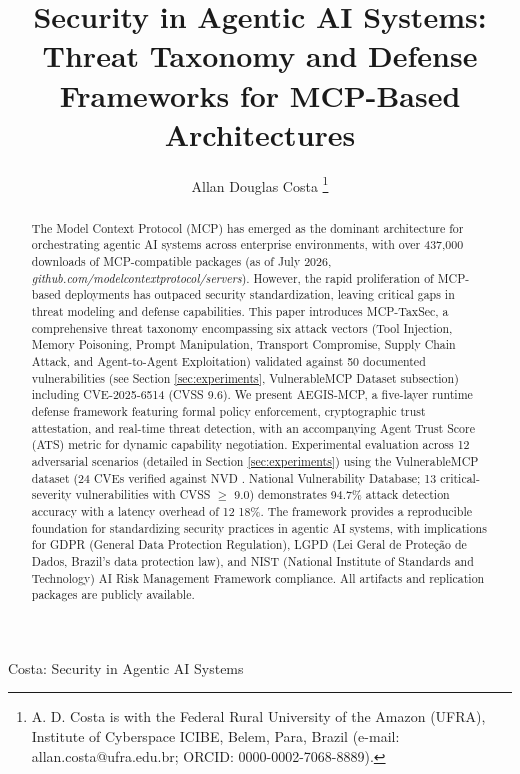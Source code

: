 \documentclass[12pt,twocolumn,journal]{IEEEtran}
\begin{document}
\title{Security in Agentic AI Systems: Threat Taxonomy and Defense Frameworks for MCP-Based Architectures}

\author{Allan Douglas Costa
\thanks{A. D. Costa is with the Federal Rural University of the Amazon (UFRA), Institute of Cyberspace ICIBE, Belem, Para, Brazil (e-mail: allan.costa@ufra.edu.br; ORCID: 0000-0002-7068-8889).}
}

%
{Costa: Security in Agentic AI Systems}

\maketitle

\begin{abstract}
The Model Context Protocol (MCP) has emerged as the dominant architecture for orchestrating agentic AI systems across enterprise environments, with over 437,000 downloads of MCP-compatible packages (as of July 2026, \textit{github.com/modelcontextprotocol/servers}). However, the rapid proliferation of MCP-based deployments has outpaced security standardization, leaving critical gaps in threat modeling and defense capabilities. This paper introduces MCP-TaxSec, a comprehensive threat taxonomy encompassing six attack vectors (Tool Injection, Memory Poisoning, Prompt Manipulation, Transport Compromise, Supply Chain Attack, and Agent-to-Agent Exploitation) validated against 50 documented vulnerabilities (see Section \ref{sec:experiments}, VulnerableMCP Dataset subsection) including CVE-2025-6514 (CVSS 9.6). We present AEGIS-MCP, a five-layer runtime defense framework featuring formal policy enforcement, cryptographic trust attestation, and real-time threat detection, with an accompanying Agent Trust Score (ATS) metric for dynamic capability negotiation. Experimental evaluation across 12 adversarial scenarios (detailed in Section \ref{sec:experiments}) using the VulnerableMCP dataset (24 CVEs verified against NVD . National Vulnerability Database; 13 critical-severity vulnerabilities with CVSS $\geq$ 9.0) demonstrates 94.7\% attack detection accuracy with a latency overhead of 12 18\%. The framework provides a reproducible foundation for standardizing security practices in agentic AI systems, with implications for GDPR (General Data Protection Regulation), LGPD (Lei Geral de Proteção de Dados, Brazil's data protection law), and NIST (National Institute of Standards and Technology) AI Risk Management Framework compliance. All artifacts and replication packages are publicly available.
\end{abstract}
\end{document}
